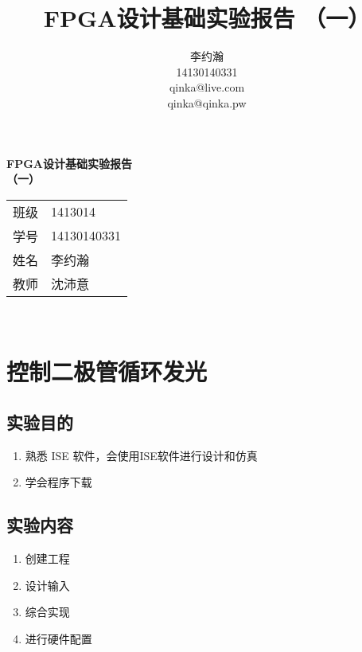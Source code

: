\documentclass{ctexart}
\author{李约瀚 \\ 14130140331 \\ qinka@live.com \\ qinka@qinka.pw}
\title{FPGA设计基础实验报告 （一）}
\begin{document}
    
        \thispagestyle{empty}
        \begin{center}
            \vspace*{4em}
            {\Huge\textbf{FPGA设计基础实验报告\\\vspace*{0.5em} （一）}}
            \vfill
            \begin{tabular}{c@{：}l}
                班级 & 1413014 \\
                学号 & 14130140331 \\ 
                姓名 & 李约瀚 \\ 
                教师 & 沈沛意 \\
            \end{tabular} 
            \vspace*{4em}\\
        \end{center}
        \newpage
        
       
        \setcounter{page}{0}
        \setcounter{section}{0}
        \renewcommand\thesection{实验编号 1-\numeric{section} 题目： }
        \renewcommand\thesubsection{}
        \renewcommand\thesubsubsection{(\numeric{subsubsection})}

        \section{控制二极管循环发光}
        
        \subsection{实验目的}
        \begin{enumerate}
        \item 熟悉 ISE 软件，会使用ISE软件进行设计和仿真
        \item 学会程序下载
        \end{enumerate}

        \subsection{实验内容}

        \begin{enumerate}
        \item 创建工程
        \item 设计输入
        \item 综合实现
        \item 进行硬件配置
        \end{enumerate}
\end{document}
